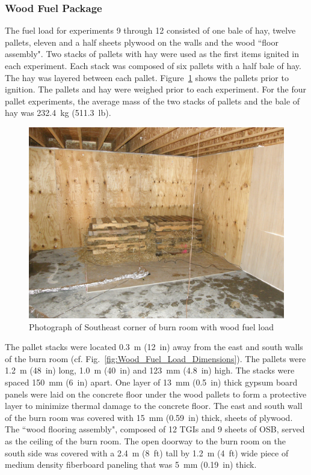 \documentclass[12pt,oneside]{book}
\begin{document}
\subsubsection{Wood Fuel Package}
\label{sec:fire_suppression_pallet_fuel}

The fuel load for experiments 9 through 12 consisted of one bale of hay, twelve pallets, eleven and a half sheets plywood on the walls and the wood ``floor assembly". Two stacks of pallets with hay were used as the first items ignited in each experiment. Each stack was composed of six pallets with a half bale of hay. The hay was layered between each pallet. Figure~\ref{fig:Wood_Fuel_Load} shows the pallets prior to ignition. The pallets and hay were weighed prior to each experiment. For the four pallet experiments, the average mass of the two stacks of pallets and the bale of hay was 232.4~kg (511.3~lb).
\begin{figure}[!ht]
	\includegraphics[width=0.65\columnwidth]{../Figures/Pictures/Wood_Fuel_Package}
	\caption{Photograph of Southeast corner of burn room with wood fuel load}
	\label{fig:Wood_Fuel_Load}
\end{figure}

The pallet stacks were located 0.3~m (12~in) away from the east and south walls of the burn room (cf. Fig.~\ref{fig:Wood_Fuel_Load_Dimensions}). The pallets were 1.2~m (48~in) long, 1.0~m (40~in) and 123~mm (4.8~in) high. The stacks were spaced 150~mm (6~in) apart. One layer of 13~mm (0.5~in) thick gypsum board panels were laid on the concrete floor under the wood pallets to form a protective layer to minimize thermal damage to the concrete floor. The east and south wall of the burn room was covered with 15~mm (0.59~in) thick, sheets of plywood.  The ``wood flooring assembly", composed of 12 TGIs and 9 sheets of OSB, served as the ceiling of the burn room. The open doorway to the burn room on the south side was covered with a 2.4~m (8~ft) tall by 1.2~m (4~ft) wide piece of medium density fiberboard paneling that was 5~mm (0.19~in) thick.
\end{document}

